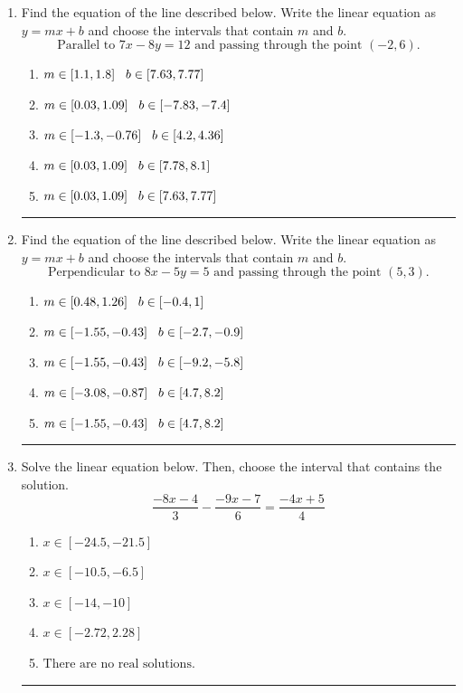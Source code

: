 \documentclass[14pt]{extbook}
\newcommand{\litem}[1]{\item#1\hspace*{-1cm}\rule{\textwidth}{0.4pt}}
\begin{document}
\begin{enumerate}
{\begin{enumerate}[label=\Alph*.]
\end{enumerate} }
\litem{
Find the equation of the line described below. Write the linear equation as $ y=mx+b $ and choose the intervals that contain $m$ and $b$.\[ \text{Parallel to } 7 x - 8 y = 12 \text{ and passing through the point } (-2, 6). \]\begin{enumerate}[label=\Alph*.]
\item \( m \in [1.1, 1.8] \hspace*{3mm} b \in [7.63, 7.77] \)
\item \( m \in [0.03, 1.09] \hspace*{3mm} b \in [-7.83, -7.4] \)
\item \( m \in [-1.3, -0.76] \hspace*{3mm} b \in [4.2, 4.36] \)
\item \( m \in [0.03, 1.09] \hspace*{3mm} b \in [7.78, 8.1] \)
\item \( m \in [0.03, 1.09] \hspace*{3mm} b \in [7.63, 7.77] \)

\end{enumerate} }
\litem{
Find the equation of the line described below. Write the linear equation as $ y=mx+b $ and choose the intervals that contain $m$ and $b$.\[ \text{Perpendicular to } 8 x - 5 y = 5 \text{ and passing through the point } (5, 3). \]\begin{enumerate}[label=\Alph*.]
\item \( m \in [0.48, 1.26] \hspace*{3mm} b \in [-0.4, 1] \)
\item \( m \in [-1.55, -0.43] \hspace*{3mm} b \in [-2.7, -0.9] \)
\item \( m \in [-1.55, -0.43] \hspace*{3mm} b \in [-9.2, -5.8] \)
\item \( m \in [-3.08, -0.87] \hspace*{3mm} b \in [4.7, 8.2] \)
\item \( m \in [-1.55, -0.43] \hspace*{3mm} b \in [4.7, 8.2] \)

\end{enumerate} }
\litem{
Solve the linear equation below. Then, choose the interval that contains the solution.\[ \frac{-8x -4}{3} - \frac{-9x -7}{6} = \frac{-4x + 5}{4} \]\begin{enumerate}[label=\Alph*.]
\item \( x \in [-24.5, -21.5] \)
\item \( x \in [-10.5, -6.5] \)
\item \( x \in [-14, -10] \)
\item \( x \in [-2.72, 2.28] \)
\item \( \text{There are no real solutions.} \)


\end{enumerate}}
\end{enumerate}
\end{document}
